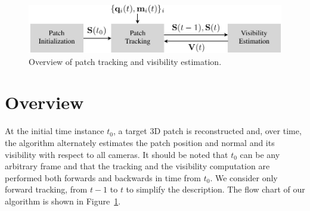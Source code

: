 


\begin{figure}[t]
	\centering
	\includegraphics[width=0.7\linewidth]{figures/FlowChart}
	\caption{Overview of patch tracking and visibility estimation.}
	\label{fig:overview}
\end{figure}

\section{Overview}
At the initial time instance $t_0$, a target 3D patch is reconstructed and, over time, the algorithm alternately estimates the patch position and normal and its visibility with respect to all cameras. It should be noted that $t_0$ can be any arbitrary frame and that the tracking and the visibility computation are performed both forwards and backwards in time from $t_0$. We consider only forward tracking, from $t-1$ to $t$ to simplify the description. The flow chart of our algorithm is shown in Figure~\ref{fig:overview}.

